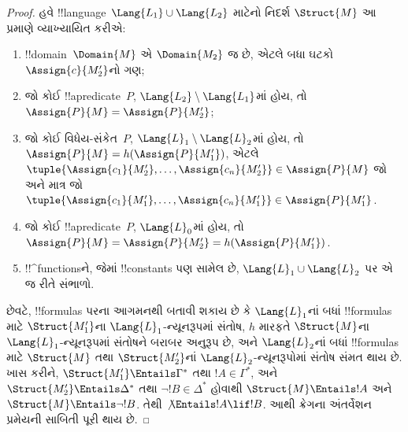 \documentclass[../../../include/open-logic-section]{subfiles}
\begin{document}
\begin{proof}
હવે !!{language}~$\Lang{L_1}\cup\Lang{L_2}$ માટેનો નિદર્શ
$\Struct{M}$ આ પ્રમાણે વ્યાખ્યાયિત કરીએ:
\begin{enumerate}
\item !!{domain}~$\Domain{M}$ એ $\Domain{M_2}$ જ છે, એટલે બધા
  ઘટકો~$\Assign{c}{M'_2}$નો ગણ;
\item જો કોઈ !!a{predicate}~$P$, $\Lang{L_2}\setminus\Lang{L_1}$માં
  હોય, તો $\Assign{P}{M}=\Assign{P}{M'_2}$;
\item જો કોઈ વિધેય-સંકેત~$P$, $\Lang{L}_1\setminus\Lang{L}_2$માં હોય, તો
  $\Assign{P}{M}=h(\Assign{P}{M'_1})$, એટલે
  $\tuple{\Assign{c_1}{M'_2},\dots,\Assign{c_n}{M'_2}}\in
  \Assign{P}{M}$ જો અને માત્ર જો
  $\tuple{\Assign{c_1}{M'_1},\dots,\Assign{c_n}{M'_1}}\in
  \Assign{P}{M'_1}$.
\item જો કોઈ !!a{predicate}~$P$, $\Lang{L}_0$માં હોય, તો
  $\Assign{P}{M}=\Assign{P}{M'_2}=h(\Assign{P}{M'_1})$.
\item !!^{function}sને, જેમાં !!{constant}s પણ સામેલ છે,
  $\Lang{L}_1\cup\Lang{L}_2$ પર એ જ રીતે સંભાળો.
\end{enumerate}

છેવટે, !!{formula}s પરના આગમનથી બતાવી શકાય છે કે $\Lang{L}_1$નાં
બધાં !!{formula}s માટે $\Struct{M'_1}$ના $\Lang{L}_1$-ન્યૂનરૂપમાં
સંતોષ, $h$ મારફતે $\Struct{M}$ના $\Lang{L}_1$-ન્યૂનરૂપમાં સંતોષને
બરાબર અનુરૂપ છે, અને $\Lang{L}_2$નાં બધાં !!{formula}s માટે
$\Struct{M}$ તથા $\Struct{M'_2}$નાં $\Lang{L}_2$-ન્યૂનરૂપોમાં સંતોષ
સંમત થાય છે. ખાસ કરીને,
$\Struct{M'_1}\Entails\Gamma^*$ તથા $!A\in\Gamma^*$, અને
$\Struct{M'_2}\Entails\Delta^*$ તથા $\lnot !B\in\Delta^*$ હોવાથી
$\Struct{M}\Entails !A$ અને $\Struct{M}\Entails\lnot !B$. તેથી
$\not\Entails !A\lif !B$. આથી ક્રેગના અંતર્વેશન પ્રમેયની સાબિતી
પૂરી થાય છે.
\end{proof}
\end{document}
